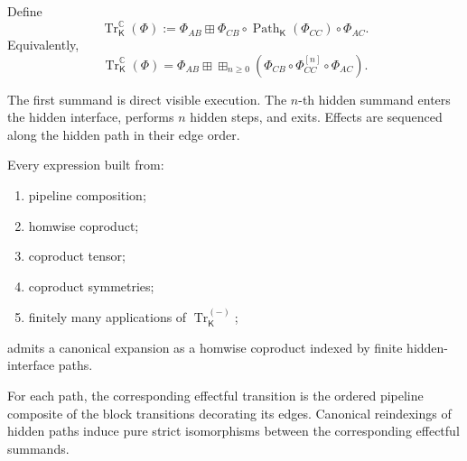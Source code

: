 \begin{definition}
\label{def:effectful-coproduct-trace}
Define
\[
    \operatorname{Tr}^{\mathbb C}_{\mathsf K}(\Phi)
    :=
    \Phi_{AB}
    \boxplus
    \Phi_{CB}
    \circ
    \operatorname{Path}_{\mathsf K}(\Phi_{CC})
    \circ
    \Phi_{AC}.
\]
Equivalently,
\[
    \operatorname{Tr}^{\mathbb C}_{\mathsf K}(\Phi)
    =
    \Phi_{AB}
    \boxplus
    \boxplus_{n\geq0}
    \left(
        \Phi_{CB}
        \circ
        \Phi_{CC}^{[n]}
        \circ
        \Phi_{AC}
    \right).
\]
\end{definition}

The first summand is direct visible execution.  The \(n\)-th hidden summand
enters the hidden interface, performs \(n\) hidden steps, and exits.  Effects
are sequenced along the hidden path in their edge order.

\begin{lemma}
\label{lem:decorated-hidden-path-normal-form}
Every expression built from:
\begin{enumerate}
    \item pipeline composition;

    \item homwise coproduct;

    \item coproduct tensor;

    \item coproduct symmetries;

    \item finitely many applications of
    \(\operatorname{Tr}^{(-)}_{\mathsf K}\);
\end{enumerate}
admits a canonical expansion as a homwise coproduct indexed by finite
hidden-interface paths.

For each path, the corresponding effectful transition is the ordered
pipeline composite of the block transitions decorating its edges.
Canonical reindexings of hidden paths induce pure strict isomorphisms between
the corresponding effectful summands.
\end{lemma}

